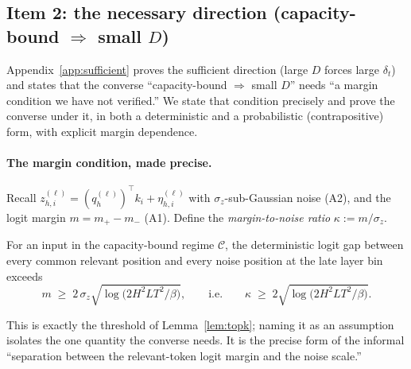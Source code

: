 \subsection{Item 2: the necessary direction (capacity-bound \texorpdfstring{$\Rightarrow$}{=>} small \texorpdfstring{$D$}{D})}
\label{app:necessary}

Appendix~\ref{app:sufficient} proves the sufficient direction (large $D$
forces large $\delta_t$) and states that the converse ``capacity-bound
$\Rightarrow$ small $D$'' needs ``a margin condition we have not verified.''
We state that condition precisely and prove the converse under it, in both a
deterministic and a probabilistic (contrapositive) form, with explicit margin
dependence.

\paragraph{The margin condition, made precise.} Recall
$z^{(\ell)}_{h,i}=(q^{(\ell)}_h)^\top k_i + \eta^{(\ell)}_{h,i}$ with
$\sigma_z$-sub-Gaussian noise (A2), and the logit margin $m=m_+-m_-$ (A1).
Define the \emph{margin-to-noise ratio} $\kappa := m/\sigma_z$.

\begin{assumption}
\label{ass:margin}
For an input in the capacity-bound regime $\mathcal{C}$, the deterministic
logit gap between every common relevant position and every noise position at
the late layer bin exceeds
\begin{equation}
\label{eq:margin-cond}
m \;\ge\; 2\,\sigma_z\sqrt{\log\!\bigl(2 H^2 L T^2/\beta\bigr)},
\qquad\text{i.e.}\qquad
\kappa \;\ge\; 2\sqrt{\log\!\bigl(2 H^2 L T^2/\beta\bigr)} .
\end{equation}
\end{assumption}
This is exactly the threshold of Lemma~\ref{lem:topk}; naming it as an
assumption isolates the one quantity the converse needs. It is the precise form
of the informal ``separation between the relevant-token logit margin and the
noise scale.''

